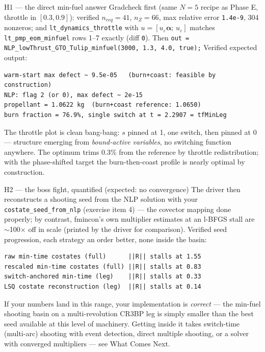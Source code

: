 \documentclass[11pt,letterpaper]{article}
\begin{document}
\begin{checkpoint}{H1 --- the direct min-fuel answer}
Gradcheck first (same $N=5$ recipe as Phase E, throttle in $[0.3,0.9]$):
verified $n_{ceq} = 41$, $n_Z = 66$, max relative error \texttt{1.4e-9},
304 nonzeros; and \texttt{lt\_dynamics\_throttle} with
$u = [u_\varepsilon\bm\alpha;\,u_\varepsilon]$ matches
\texttt{lt\_pmp\_eom\_minfuel} rows 1--7 exactly (diff \texttt{0}). Then
\texttt{out = NLP\_lowThrust\_GTO\_Tulip\_minfuel(3000, 1.3, 4.0, true);}
Verified expected output:
\begin{verbatim}
warm-start max defect ~ 9.5e-05   (burn+coast: feasible by construction)
NLP: flag 2 (or 0), max defect ~ 2e-15
propellant = 1.0622 kg  (burn+coast reference: 1.0650)
burn fraction = 76.9%, single switch at t = 2.2907 = tfMinLeg
\end{verbatim}
The throttle plot is clean bang-bang: $s$ pinned at 1, one switch, then
pinned at 0 --- structure emerging from \emph{bound-active variables},
no switching function anywhere. The optimum trims 0.3\% from the
reference by throttle redistribution; with the phase-shifted target the
burn-then-coast profile is nearly optimal by construction.
\end{checkpoint}

\begin{checkpoint}{H2 --- the boss fight, quantified (expected: no convergence)}
The driver then reconstructs a shooting seed from the NLP solution with
your \texttt{costate\_seed\_from\_nlp} (exercise item 4) --- the
covector mapping done properly; by contrast, fmincon's own
multiplier estimates at an l-BFGS stall are $\sim$100$\times$ off in
scale (printed by the driver for comparison). Verified seed progression,
each strategy an order better, none inside the basin:
\begin{verbatim}
raw min-time costates (full)      ||R|| stalls at 1.55
rescaled min-time costates (full) ||R|| stalls at 0.83
switch-anchored min-time (leg)    ||R|| stalls at 0.33
LSQ costate reconstruction (leg)  ||R|| stalls at 0.14
\end{verbatim}
If your numbers land in this range, your implementation is
\emph{correct} --- the min-fuel shooting basin on a multi-revolution
CR3BP leg is simply smaller than the best seed available at this level
of machinery. Getting inside it takes switch-time (multi-arc) shooting
with event detection, direct multiple shooting, or a solver with
converged multipliers --- see What Comes Next.
\end{checkpoint}
\end{document}
